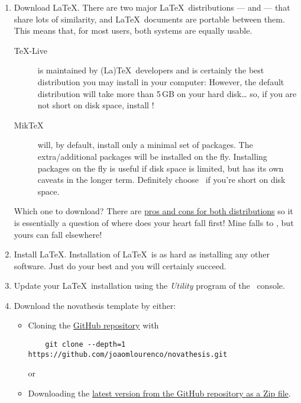 \begin{enumerate}
  \item Download \LaTeX.  There are two major \LaTeX\ distributions — \href{https://miktex.org/}{\MikTeX} and \href{https://www.tug.org/texlive/}{\TeXLive} — that share lots of similarity, and \LaTeX\ documents are portable between them. This means that, for most users, both systems are equally usable.
  \begin{description}
    \item [\TeX-Live] is maintained by (La)\TeX\ developers and is certainly the best distribution you may install in your computer:  However, the default distribution will take more than 5\,GB on your hard disk… so, if you are not short on disk space, install \TeXLive!
    \item[Mik\TeX] will, by default, install only a minimal set of packages. The extra/additional packages will be installed on the fly.  Installing packages on the fly is useful if disk space is limited, but has its own caveats in the longer term.  Definitely choose \MikTeX\ if you're short on disk space.
  \end{description}
  Which one to download?  There are \href{https://tex.stackexchange.com/questions/20036/what-are-the-advantages-of-tex-live-over-miktex}{pros and cons for both distributions} so it is essentially a question of where does your heart fall first!  Mine falls to \TeXLive, but yours can fall elsewhere!  \emojiSmile
  \item Install \LaTeX. Installation of \LaTeX\ is as hard as installing any other software.  Just do your best and you will certainly succeed. 
  \item Update your \LaTeX\ installation using the \emph{\TeXLive Utility} program of the \MikTeX\ console.
  \item Download the \gls{novathesis} template by either:
  \begin{itemize}
    \item Cloning the \href{https://github.com/joaomlourenco/novathesis}{GitHub repository} with
    \begin{verbatim}    git clone --depth=1 https://github.com/joaomlourenco/novathesis.git\end{verbatim}
    or
    \item Downloading the \href{https://github.com/joaomlourenco/novathesis/archive/main.zip}{latest version from the GitHub repository as a Zip file}.
  \end{itemize}


\end{enumerate}
